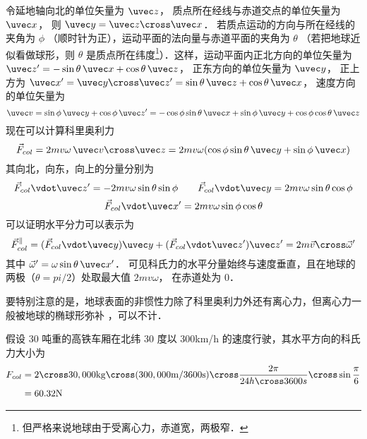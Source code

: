 

令延地轴向北的单位矢量为 $\uvec z$， 质点所在经线与赤道交点的单位矢量为 $\uvec x$， 则 $\uvec y = \uvec z\cross\uvec x$． 若质点运动的方向与所在经线的夹角为 $\phi$ （顺时针为正），运动平面的法向量与赤道平面的夹角为 $\theta$ （若把地球近似看做球形，则 $\theta$ 是质点所在纬度\footnote{但严格来说地球由于受离心力，赤道宽，两极窄．}）．这样，运动平面内正北方向的单位矢量为 $\uvec z' = -\sin\theta \,\uvec x + \cos\theta\,\uvec z$， 正东方向的单位矢量为 $\uvec y$， 正上方为 $\uvec x' = \uvec y\cross\uvec z' = \sin\theta \,\uvec z + \cos\theta\,\uvec x$， 速度方向的单位矢量为
\begin{equation}
\uvec v = \sin\phi\,\uvec y + \cos\phi\,\uvec z' = -\cos\phi\sin\theta \,\uvec x + \sin\phi\,\uvec y+\cos\phi\cos\theta\,\uvec z
\end{equation}
现在可以计算科里奥利力
\begin{equation}
\vec F_{col} = 2mv\omega\,\uvec v\cross\uvec z = 2mv\omega (\cos\phi\sin\theta\,\uvec y + \sin\phi\,\uvec x)
\end{equation}
其向北，向东，向上的分量分别为
\begin{equation}
\vec F_{col}\vdot\uvec z' = -2mv\omega\sin\theta\sin\phi
\qquad
\vec F_{col}\vdot\uvec y = 2mv\omega\sin\theta\cos\phi
\end{equation}
\begin{equation}
\vec F_{col}\vdot\uvec x' = 2mv\omega\sin\phi\cos\theta
\end{equation}
可以证明水平分力可以表示为
\begin{equation}
\vec F_{col}^{\|} = (\vec F_{col}\vdot\uvec y)\uvec y + (\vec F_{col}\vdot\uvec z')\uvec z' = 2m\vec v\cross\vec\omega'
\end{equation}
其中 $\vec\omega' = \omega\sin\theta\,\uvec x'$． 可见科氏力的水平分量始终与速度垂直，且在地球的两极（$\theta = pi/2$）处取最大值 $2mv\omega$， 在赤道处为 0．

要特别注意的是，地球表面的非惯性力除了科里奥利力外还有离心力，但离心力一般被地球的椭球形弥补%
，可以不计．

\begin{exam}{}
假设 30 吨重的高铁车厢在北纬 30 度以 300km/h 的速度行驶，其水平方向的科氏力大小为
\begin{equation}\begin{aligned}
F_{col} &= 2\cross30,000\mathrm{kg}\cross(300,000\mathrm{m}/3600\mathrm{s})\cross\frac{2\pi}{24h\cross3600s}\cross\sin\frac{\pi}{6} \\
&= 60.32\mathrm{N}
\end{aligned}\end{equation}
\end{exam}

